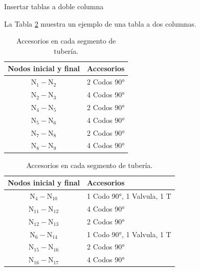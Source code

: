 \documentclass{beamer}
\begin{document}
\begin{frame}{Insertar tablas a doble columna}

    La Tabla \ref{Tab:Accesorios} muestra un ejemplo de una tabla a dos columnas.
    
    \begin{table}[htbp]
        \centering
        \caption{Accesorios en cada segmento de tubería.}
        \vspace{-\baselineskip}
        \label{Tab:Accesorios}
        \null\hfill
        \scriptsize
        \begin{tabular}{cl}
        \toprule
        \textbf{Nodos inicial y final} & \textbf{Accesorios} \\
        \midrule
        $\text{N}_{1}-\text{N}_{2}$ & 2 Codos 90°\\
        $\text{N}_{2}-\text{N}_{3}$ & 4 Codos 90° \\ 
        
        $\text{N}_{4}-\text{N}_{5}$ & 2 Codos 90° \\ 
        $\text{N}_{5}-\text{N}_{6}$ & 4 Codos 90° \\ 
        
        $\text{N}_{7}-\text{N}_{8}$ & 2 Codos 90° \\
        $\text{N}_{8}-\text{N}_{9}$ & 4 Codos 90° \\ 
        \bottomrule
        \end{tabular}
        \hfill\hfill
        \begin{tabular}{cl}
        \toprule
        \textbf{Nodos inicial y final} & \textbf{Accesorios} \\
        \midrule
        $\text{N}_{4}-\text{N}_{10}$ & 1 Codo 90°, 1 Valvula, 1 T \\ 
        
        $\text{N}_{11}-\text{N}_{12}$ & 4 Codos 90° \\ 
        $\text{N}_{12}-\text{N}_{13}$ & 2 Codos 90° \\ 
        $\text{N}_{6}-\text{N}_{14}$ & 1 Codo 90°, 1 Valvula, 1 T \\ 
        
        $\text{N}_{15}-\text{N}_{16}$ & 2 Codos 90° \\ 
        $\text{N}_{16}-\text{N}_{17}$ & 4 Codos 90° \\ 
        \bottomrule
        \end{tabular}
        \hfill\null
    \end{table}
    
\end{frame}
\end{document}
